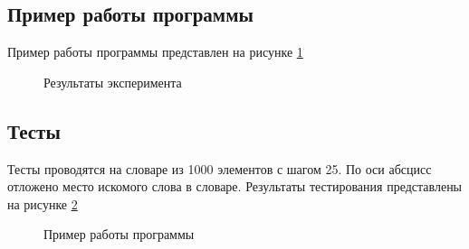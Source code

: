 \documentclass{article}
\begin{document}
	\subsection{Пример работы программы}
	Пример работы программы представлен на рисунке \hyperref[programmWork]{\ref{programmWork}}
	 	\begin{figure}[h!]
		 	\caption{Результаты эксперимента}
		 	\label{programmWork}
	 	\end{figure}

	\subsection{Тесты}
	Тесты проводятся на словаре из 1000 элементов с шагом 25. По оси абсцисс отложено место искомого слова в словаре. Результаты тестирования представлены на рисунке \hyperref[tests]{\ref{tests}}
	 	\begin{figure}[h!]
		 	\caption{Пример работы программы}
		 	\label{tests}
	 	\end{figure}
	\newpage
\end{document}
